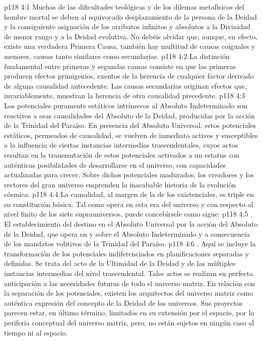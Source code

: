 \vs p118 4:1 Muchas de las dificultades teológicas y de los dilemas metafísicos del hombre mortal se deben al equivocado desplazamiento de la persona de la Deidad y la consiguiente asignación de los atributos infinitos y absolutos a la Divinidad de menor rango y a la Deidad evolutiva. No debéis olvidar que, aunque, en efecto, existe una verdadera Primera Causa, también hay multitud de causas coiguales y menores, causas tanto similares como secundarias.
\vs p118 4:2 La distinción fundamental entre primeras y segundas causas consiste en que las primeras producen efectos primigenios, exentos de la herencia de cualquier factor derivado de alguna causalidad antecedente. Las causas secundarias originan efectos que, invariablemente, muestran la herencia de otra causalidad precedente.
\vs p118 4:3 \pc Los potenciales puramente estáticos intrínsecos al Absoluto Indeterminado son reactivos a esas causalidades del Absoluto de la Deidad, producidas por la acción de la Trinidad del Paraíso. En presencia del Absoluto Universal, estos potenciales estáticos, permeados de causalidad, se vuelven de inmediato activos y susceptibles a la influencia de ciertas instancias intermedias trascendentales, cuyos actos resultan en la transmutación de estos potenciales activados a un estatus con auténticas posibilidades de desarrollarse en el universo, con capacidades actualizadas para crecer. Sobre dichos potenciales madurados, los creadores y los rectores del gran universo emprenden la inacabable historia de la evolución cósmica.
\vs p118 4:4 La causalidad, al margen de la de los existenciales, es triple en su constitución básica. Tal como opera en esta era del universo y con respecto al nivel finito de los siete suprauniversos, puede concebírsele como sigue:
\vs p118 4:5 . El establecimiento del destino en el Absoluto Universal por la acción del Absoluto de la Deidad, que opera en y sobre el Absoluto Indeterminado y a consecuencia de los mandatos volitivos de la Trinidad del Paraíso.
\vs p118 4:6 . Aquí se incluye la transformación de los potenciales indiferenciados en planificaciones separadas y definidas. Se trata del acto de la Ultimidad de la Deidad y de las múltiples instancias intermedias del nivel trascendental. Tales actos se realizan en perfecta anticipación a las necesidades futuras de todo el universo matriz. En relación con la separación de los potenciales, existen los arquitectos del universo matriz como auténtica expresión del concepto de la Deidad de los universos. Sus proyectos parecen estar, en último término, limitados en su extensión por el espacio, por la periferia conceptual del universo matriz, pero,  no están sujetos en ningún caso al tiempo ni al espacio.
